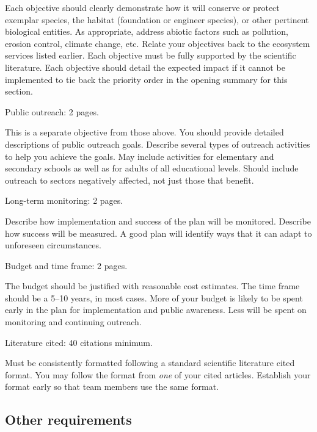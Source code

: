 \documentclass[12pt, hidelinks]{exam}
\begin{document}
\begin{questions}
	Each objective should clearly demonstrate how it will conserve or protect exemplar species, the habitat (foundation or engineer species), or other pertinent biological entities. As appropriate, address abiotic factors such as pollution, erosion control, climate change, etc. Relate your objectives back to the ecosystem services listed earlier. Each objective must be fully supported by the scientific literature. Each objective should detail the expected impact if it cannot be implemented to tie back the priority order in the opening summary for this section.
	
	
	\question[20]
	Public outreach: 2 pages.
	
	This is a separate objective from those above. You should provide detailed descriptions of public outreach goals. Describe several types of outreach activities to help you achieve the goals. May include activities for elementary and secondary schools as well as for adults of all educational levels. Should include outreach to sectors negatively affected, not just those that benefit. 
	
	\question[20]
	Long-term monitoring: 2 pages.
	
	Describe how implementation and success of the plan will be monitored. Describe how success will be measured. A good plan will identify ways that it can adapt to unforeseen circumstances.
	
	\question[10]
	Budget and time frame: 2 pages.
	
	The budget should be justified with reasonable cost estimates. The time frame should be a 5–10 years, in most cases. More of your budget is likely to be spent early in the plan for implementation and public awareness. Less will be spent on monitoring and continuing outreach.
	
	\question[10]
	Literature cited: 40 citations minimum.
	
	Must be consistently formatted following a standard scientific literature cited format. You may follow the format from \emph{one} of your cited articles. Establish your format early so that team members use the same format. 
	
\end{questions}

\subsection*{Other requirements}
\end{document}
